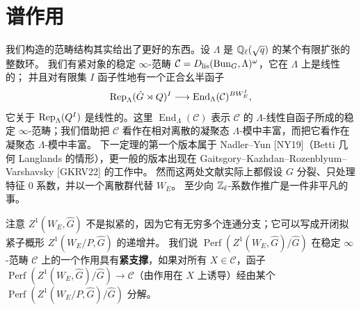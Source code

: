 
\section{谱作用}

我们构造的范畴结构其实给出了更好的东西。设 $\Lambda$ 是 $\mathbb{Q}_\ell(\sqrt q)$ 的某个有限扩张的整数环。
我们有紧对象的稳定 $\infty$-范畴 $\mathcal C=D_{\mathrm{lis}}(\mathrm{Bun}_G,\Lambda)^{\omega}$，它在 $\Lambda$ 上是线性的；
并且对有限集 $I$ 函子性地有一个正合幺半函子
\[
  \mathrm{Rep}_\Lambda(\hat G\rtimes Q)^I\longrightarrow \operatorname{End}_\Lambda(\mathcal C)^{BW_E^I},
\]
它关于 $\mathrm{Rep}_\Lambda(Q^I)$ 是线性的。这里 $\operatorname{End}_\Lambda(\mathcal C)$ 表示 $\mathcal C$ 的 $\Lambda$-线性自函子所成的稳定 $\infty$-范畴；我们借助把 $\mathcal C$ 看作在相对离散的凝聚态 $\Lambda$-模中丰富，而把它看作在凝聚态 $\Lambda$-模中丰富。
下一定理的第一个版本属于 Nadler--Yun [NY19]（Betti 几何 Langlands 的情形），更一般的版本出现在 Gaitsgory--Kazhdan--Rozenblyum--Varshavsky [GKRV22] 的工作中。
然而这两处文献实际上都假设 $G$ 分裂、只处理特征 $0$ 系数，并以一个离散群代替 $W_E$。
至少向 $\mathbb{Z}_\ell$-系数作推广是一件非平凡的事。

注意 $Z^1(W_E,\hat G)$ 不是拟紧的，因为它有无穷多个连通分支；它可以写成开闭拟紧子概形 $Z^1(W_E/P,\hat G)$ 的递增并。
我们说 $\operatorname{Perf}(Z^1(W_E,\hat G)/\hat G)$ 在稳定 $\infty$-范畴 $\mathcal C$ 上的一个作用具有\textbf{紧支撑}，如果对所有 $X\in\mathcal C$，函子
$\operatorname{Perf}(Z^1(W_E,\hat G)/\hat G)\to\mathcal C$（由作用在 $X$ 上诱导）经由某个 $\operatorname{Perf}(Z^1(W_E/P,\hat G)/\hat G)$ 分解。

